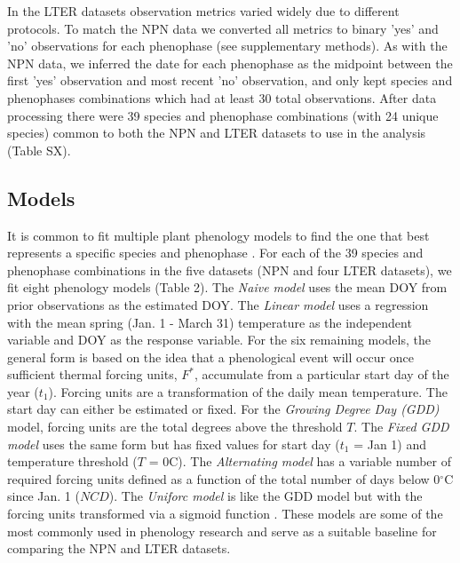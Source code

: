 \documentclass[fleqn,12pt,lineno]{wlpeerj} %
\begin{document}
In the LTER datasets observation metrics varied widely due to different protocols. To match the NPN data we converted all metrics to binary 'yes' and 'no' observations for each phenophase (see supplementary methods). As with the NPN data, we inferred the date for each phenophase as the midpoint between the first 'yes' observation and most recent 'no' observation, and only kept species and phenophases combinations which had at least 30 total observations. After data processing there were 39 species and phenophase combinations (with 24 unique species) common to both the NPN and LTER datasets to use in the analysis (Table SX).

\subsection*{Models}

It is common to fit multiple plant phenology models to find the one that best represents a specific species and phenophase \citep{chuine2013}. For each of the 39 species and phenophase combinations in the five datasets (NPN and four LTER datasets), we fit eight phenology models (Table 2). The \textit{Naive model} uses the mean DOY from prior observations as the estimated DOY. The \textit{Linear model} uses a regression with the mean spring (Jan. 1 - March 31) temperature as the independent variable and DOY as the response variable. For the six remaining models, the general form is based on the idea that a phenological event will occur once sufficient thermal forcing units, $F^{*}$, accumulate from a particular start day of the year ($t_{1}$). Forcing units are a transformation of the daily mean temperature. The start day can either be estimated or fixed. For the \textit{Growing Degree Day (GDD)} model, forcing units are the total degrees above the threshold $T$. The \textit{Fixed GDD model} uses the same form but has fixed values for start day ($t_{1}$ = Jan 1) and temperature threshold ($T$ = 0C). The \textit{Alternating model} has a variable number of required forcing units defined as a function of the total number of days below 0$^{\circ}$C since Jan. 1 ($NCD$). The \textit{Uniforc model} is like the GDD model but with the forcing units transformed via a sigmoid function \citep{chuine2000}. These models are some of the most commonly used in phenology research and serve as a suitable baseline for comparing the NPN and LTER datasets.
\end{document}
